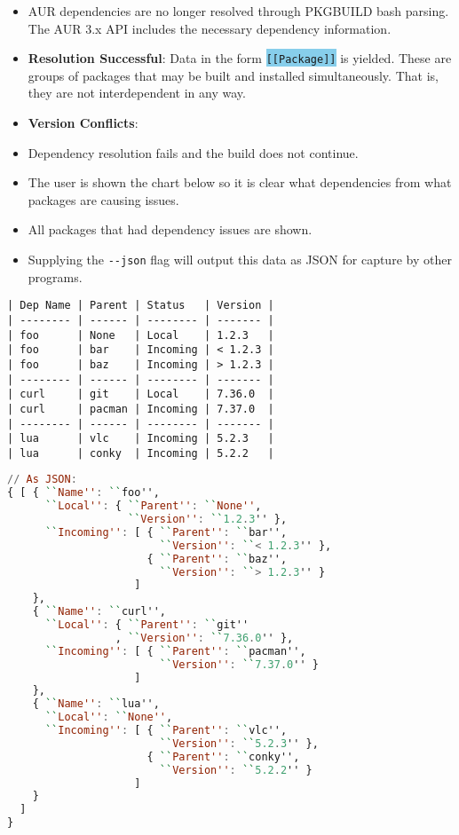 \documentclass{article}
\begin{document}
\begin{itemize}
\itemsep1pt\parskip0pt
\item
  AUR dependencies are no longer resolved through PKGBUILD bash parsing.
  The AUR 3.x API includes the necessary dependency information.
\item
  \textbf{Resolution Successful}: Data in the form
  \colorbox{SkyBlue}{\texttt{{[}{[}Package{]}{]}}} is yielded. These are groups of packages
  that may be built and installed simultaneously. That is, they are not
  interdependent in any way.
\item
  \textbf{Version Conflicts}:
\item
  Dependency resolution fails and the build does not continue.
\item
  The user is shown the chart below so it is clear what dependencies
  from what packages are causing issues.
\item
  All packages that had dependency issues are shown.
\item
  Supplying the \texttt{-\/-json} flag will output this data as JSON for
  capture by other programs.
\end{itemize}

\begin{verbatim}
| Dep Name | Parent | Status   | Version |
| -------- | ------ | -------- | ------- |
| foo      | None   | Local    | 1.2.3   |
| foo      | bar    | Incoming | < 1.2.3 |
| foo      | baz    | Incoming | > 1.2.3 |
| -------- | ------ | -------- | ------- |
| curl     | git    | Local    | 7.36.0  |
| curl     | pacman | Incoming | 7.37.0  |
| -------- | ------ | -------- | ------- |
| lua      | vlc    | Incoming | 5.2.3   |
| lua      | conky  | Incoming | 5.2.2   |
\end{verbatim}

\begin{shaded}
\begin{lstlisting}[language=haskell]
// As JSON:
{ [ { ``Name'': ``foo'',
      ``Local'': { ``Parent'': ``None'',
                   ``Version'': ``1.2.3'' },
      ``Incoming'': [ { ``Parent'': ``bar'',
                        ``Version'': ``< 1.2.3'' },
                      { ``Parent'': ``baz'',
                        ``Version'': ``> 1.2.3'' }
                    ]
    },
    { ``Name'': ``curl'',
      ``Local'': { ``Parent'': ``git''
                 , ``Version'': ``7.36.0'' },
      ``Incoming'': [ { ``Parent'': ``pacman'',
                        ``Version'': ``7.37.0'' }
                    ]
    },
    { ``Name'': ``lua'',
      ``Local'': ``None'',
      ``Incoming'': [ { ``Parent'': ``vlc'',
                        ``Version'': ``5.2.3'' },
                      { ``Parent'': ``conky'',
                        ``Version'': ``5.2.2'' }
                    ]
    }
  ]
}
\end{lstlisting}
\end{shaded}
\end{document}
